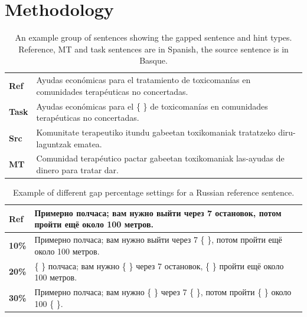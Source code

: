 \documentclass[11pt]{article}
\newcommand{\comment}[1]{}
\newcommand{\rus}[1]{\foreignlanguage{russian}{#1}}
\begin{document}
\section{Methodology}
\label{sec:methodology}

\begin{table}
  \centering
  \begin{tabular}{|l|l|}
     \hline
     \textbf{Ref}  & Ayudas econ\'{o}micas para el tratamiento de toxicoman\'{i}as en comunidades terap\'{e}uticas no concertadas. \\
     \textbf{Task} & Ayudas econ\'{o}micas para el \{ \} de toxicoman\'{i}as en comunidades terap\'{e}uticas no concertadas. \\
     \textbf{Src}  & Komunitate terapeutiko itundu gabeetan toxikomaniak tratatzeko diru-laguntzak ematea. \\
     \textbf{MT}   & Comunidad terap\'{e}utico pactar gabeetan toxikomaniak las-ayudas de dinero para tratar dar. \\
     \hline
  \end{tabular}
  \caption{An example group of sentences showing the gapped sentence and hint types. Reference, MT and task sentences are in Spanish, the source sentence is in Basque.} 
  \label{table:example}
\end{table}

\begin{table}
  \centering
  \begin{tabular}{|l|l|}
     \hline
     \textbf{Ref} & \rus{{\small Примерно полчаса; вам нужно выйти через 7 остановок, потом пройти ещё около 100 метров.}} \\
     \hline
     \textbf{10\%} & \rus{{\small Примерно полчаса; вам нужно выйти через 7 \{ \}, потом пройти ещё около 100 метров.}} \\
     \textbf{20\%} & \rus{{\small \{ \} полчаса; вам нужно \{ \} через 7 остановок, \{ \} пройти ещё около 100 метров.}} \\
     \textbf{30\%} & \rus{{\small Примерно полчаса; вам нужно \{ \} через 7 \{ \}, потом пройти \{ \} около 100 \{ \}.}} \\
     \hline
  \end{tabular}
  \caption{Example of different gap percentage settings for a Russian reference sentence.} 
  \label{table:percentage}
\end{table}
\comment{MLF the gap percentage table 2 is not referenced in the text; also, i have changed it to have the \textbf{Ref} row in the table?}
\end{document}
